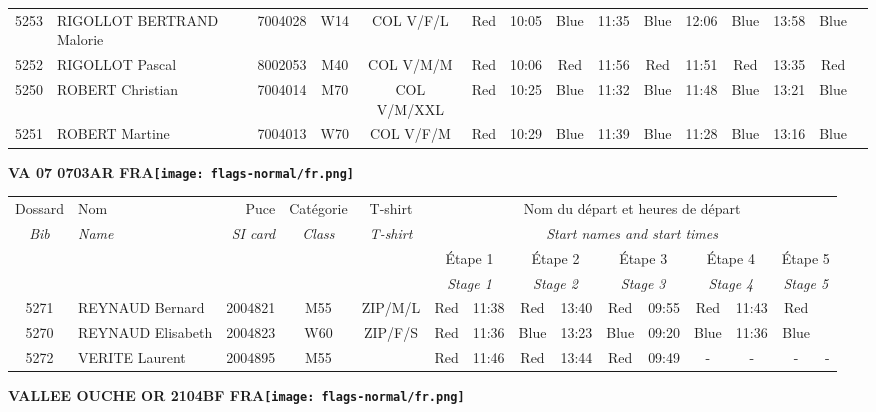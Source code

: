 \documentclass{report}
\begin{document}
\begin{longtable}{|c|l|r|c|c|*{5}{cc|}}
    5253 & RIGOLLOT BERTRAND Malorie & 7004028 & W14 & COL V/F/L & Red & 10:05 & Blue & 11:35 & Blue & 12:06 & Blue & 13:58 & Blue &  \\
    5252 & RIGOLLOT Pascal & 8002053 & M40 & COL V/M/M & Red & 10:06 & Red & 11:56 & Red & 11:51 & Red & 13:35 & Red &  \\
    5250 & ROBERT Christian & 7004014 & M70 & COL V/M/XXL & Red & 10:25 & Blue & 11:32 & Blue & 11:48 & Blue & 13:21 & Blue &  \\
    5251 & ROBERT Martine & 7004013 & W70 & COL V/F/M & Red & 10:29 & Blue & 11:39 & Blue & 11:28 & Blue & 13:16 & Blue &  \\
  \end{longtable}
\newpage
  \Huge \centering \bfseries VA 07 0703AR FRA\normalfont \footnotesize \sffamily \hfill \texttt{[image: flags-normal/fr.png]} \newline 
  \begin{longtable}{|c|l|r|c|c|*{5}{cc|}}
    Dossard & Nom  & Puce    & Catégorie & T-shirt & \multicolumn{10}{c|}{Nom du départ et heures de départ} \\
    \itshape Bib     & \itshape Name & \itshape SI card & \itshape Class  & \itshape  T-shirt  & \multicolumn{10}{c|}{\itshape Start names and start times} \\
    \hline
    & & & & & \multicolumn{2}{c|}{Étape 1} & \multicolumn{2}{c|}{Étape 2} & \multicolumn{2}{c|}{Étape 3} & \multicolumn{2}{c|}{Étape 4} & \multicolumn{2}{c|}{Étape 5} \\
    & & & & & \multicolumn{2}{c|}{\itshape Stage 1} & \multicolumn{2}{c|}{\itshape Stage 2} & \multicolumn{2}{c|}{\itshape Stage 3} & \multicolumn{2}{c|}{\itshape Stage 4} & \multicolumn{2}{c|}{\itshape Stage 5} \\
    \hline
    5271 & REYNAUD Bernard & 2004821 & M55 & ZIP/M/L & Red & 11:38 & Red & 13:40 & Red & 09:55 & Red & 11:43 & Red &  \\
    5270 & REYNAUD Elisabeth & 2004823 & W60 & ZIP/F/S & Red & 11:36 & Blue & 13:23 & Blue & 09:20 & Blue & 11:36 & Blue &  \\
    5272 & VERITE Laurent & 2004895 & M55 &   & Red & 11:46 & Red & 13:44 & Red & 09:49 & - &  - & - &  -\\
  \end{longtable}
\newpage
  \Huge \centering \bfseries VALLEE OUCHE OR 2104BF FRA\normalfont \footnotesize \sffamily \hfill \texttt{[image: flags-normal/fr.png]} \newline 
\end{document}
